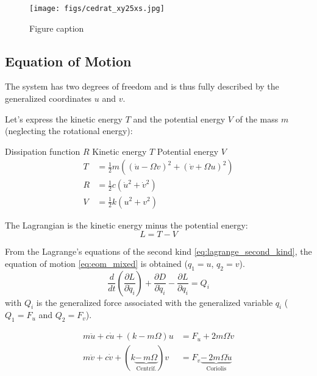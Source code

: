 \documentclass{ISMA_USD2020}
\begin{document}
\begin{figure}[htbp]
\centering
\texttt{[image: figs/cedrat\_xy25xs.jpg]}
\caption{\label{fig:cedrat_xy25xs}Figure caption}
\end{figure}

\subsection{Equation of Motion}
\label{sec:orgdb109d9}
The system has two degrees of freedom and is thus fully described by the generalized coordinates \(u\) and \(v\).

Let's express the kinetic energy \(T\) and the potential energy \(V\) of the mass \(m\) (neglecting the rotational energy):

Dissipation function \(R\)
Kinetic energy \(T\)
Potential energy \(V\)
\begin{subequations}
  \begin{align}
    T & = \frac{1}{2} m \left( \left( \dot{u} - \Omega v \right)^2 + \left( \dot{v} + \Omega u \right)^2 \right) \\
    R & = \frac{1}{2} c \left( \dot{u}^2 + \dot{v}^2 \right) \\
    V & = \frac{1}{2} k \left( u^2 + v^2 \right)
  \end{align}
\end{subequations}

The Lagrangian is the kinetic energy minus the potential energy:
\begin{equation}
L = T - V
\end{equation}

From the Lagrange's equations of the second kind \eqref{eq:lagrange_second_kind}, the equation of motion \eqref{eq:eom_mixed} is obtained (\(q_1 = u\), \(q_2 = v\)).
\begin{equation}
  \frac{d}{dt} \left( \frac{\partial L}{\partial \dot{q}_i} \right) + \frac{\partial D}{\partial \dot{q}_i} - \frac{\partial L}{\partial q_i} = Q_i
\end{equation}
with \(Q_i\) is the generalized force associated with the generalized variable \(q_i\) (\(Q_1 = F_u\) and \(Q_2 = F_v\)).


\begin{subequations}
  \begin{align}
    m \ddot{u} + c \dot{u} + ( k - m \Omega ) u &= F_u + 2 m \Omega \dot{v} \\
    m \ddot{v} + c \dot{v} + ( k \underbrace{-\,m \Omega}_{\text{Centrif.}} ) v &= F_v \underbrace{-\,2 m \Omega \dot{u}}_{\text{Coriolis}}
  \end{align}
\end{subequations}
\end{document}
